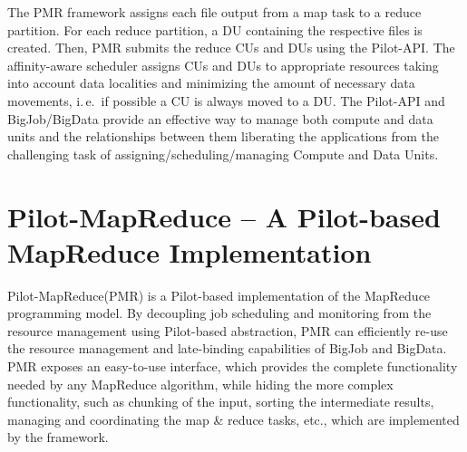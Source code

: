 \documentclass{acm_proc_article-sp}
\newcommand{\jhanote}[1]{ {\textcolor{red} { ***SJ: #1 }}}
\newcommand{\alnote}[1]{ {\textcolor{blue} { ***andreL: #1 }}}
\newcommand{\pnote}[1]{ {\textcolor{magenta} { ***pradeep: #1 }}}
\newcommand{\secrev}[1]{ {\textcolor{Bittersweet} { ***reviewer2: #1 }}}
\newcommand{\alnote}[1]{}
\newcommand{\pnote}[1]{}
\newcommand{\jhanote}[1]{}
\newcommand{\upp}{\vspace*{-0.5em}}
\newcommand{\pilot}{Pilot\xspace}
\newcommand{\pilotmapreduce}{Pilot-MapReduce\xspace}
\newcommand{\dataunits}{Data Units\xspace}
\begin{document}
The PMR framework assigns each file output from a map task to a reduce
partition. For each reduce partition, a DU containing the respective
files is created. Then, PMR submits the reduce CUs and DUs using the
Pilot-API. The affinity-aware scheduler assigns CUs and DUs to
appropriate resources taking into account data localities and
minimizing the amount of necessary data movements, i.\,e.\ if possible
a CU is always moved to a DU.  The Pilot-API and BigJob/BigData
provide an effective way to manage both compute and data units and the
relationships between them liberating the applications from the
challenging task of assigning/scheduling/managing Compute and
\dataunits.






\upp
\section{Pilot-MapReduce -- A Pilot-based MapReduce Implementation}
\label{sec-pilot-mr}

  

\pilotmapreduce (PMR) is a \pilot-based implementation of the
MapReduce programming model. 
By decoupling job scheduling and monitoring from the resource management using
\pilot-based abstraction, PMR can efficiently re-use the resource management
and late-binding capabilities of BigJob and BigData. PMR exposes an
easy-to-use interface, which provides the
complete functionality needed by any MapReduce algorithm, while hiding
the more complex functionality, such as chunking of the input, sorting
the intermediate results, managing and coordinating the map \& reduce
tasks, etc., which are implemented by the framework.
\end{document}
